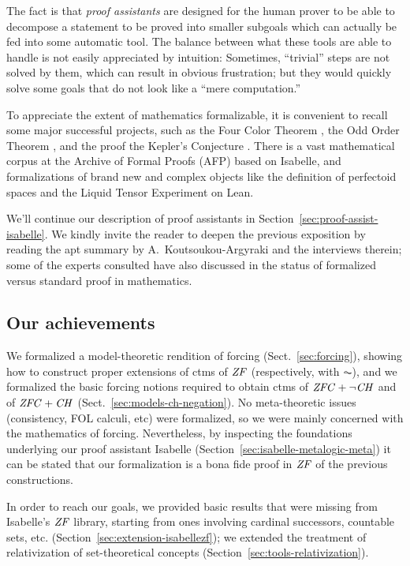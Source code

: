 The fact is that \emph{proof assistants} are designed for the human prover to
be able to decompose a statement to be proved into smaller subgoals
which can actually be fed into some automatic tool. The balance between
what these tools are able to handle is not  easily appreciated by
intuition: Sometimes, ``trivial'' steps are not solved by them, which
can result in obvious frustration; but they would quickly solve some
goals that do not look like a ``mere computation.''

To appreciate the extent of mathematics formalizable, it is convenient to recall
some major successful projects, such as the Four Color Theorem
\cite{MR2463991}, the Odd Order Theorem
\cite{10.1007/978-3-642-39634-2_14}, and the proof the Kepler's
Conjecture \cite{MR3659768}. There is a vast mathematical corpus at
the Archive of Formal Proofs (AFP) based on Isabelle, and formalizations of
brand new and complex objects like the definition of perfectoid spaces \cite{10.1145/3372885.3373830}
and the Liquid Tensor Experiment \cite{LTE2020,LTE2021} on Lean.

We'll continue our description of proof assistants in
Section~\ref{sec:proof-assist-isabelle}. We kindly invite the reader
to deepen the previous exposition by reading the apt summary by
A.~Koutsoukou-Argyraki \cite{angeliki} and the interviews
therein; some of the experts consulted have also discussed
in \cite{2022arXiv220704779B} the status of formalized versus standard
proof in mathematics.

\subsection{Our achievements}
We formalized a model-theoretic rendition of forcing (Sect.~\ref{sec:forcing}), showing how to
construct proper extensions of ctms of $\mathit{ZF}$ (respectively, with
$\AC$), and we formalized the basic forcing notions required to obtain
ctms of $\mathit{ZFC} + \neg\mathit{CH}$ and of $\mathit{ZFC} + \mathit{CH}$ (Sect.~\ref{sec:models-ch-negation}). No meta-theoretic issues
(consistency, FOL calculi, etc) were formalized, so we were mainly
concerned with the mathematics of forcing. Nevertheless, by inspecting
the foundations underlying our proof assistant Isabelle
(Section~\ref{sec:isabelle-metalogic-meta}) it can be stated that our
formalization is a bona fide proof in $\mathit{ZF}$ of the previous
constructions.

In order to reach our goals, we provided basic results that were
missing from Isabelle's $\mathit{ZF}$ library, starting from ones
involving cardinal successors, countable sets, etc.
(Section~\ref{sec:extension-isabellezf}); we extended the treatment of relativization of
set-theoretical concepts (Section~\ref{sec:tools-relativization}).

